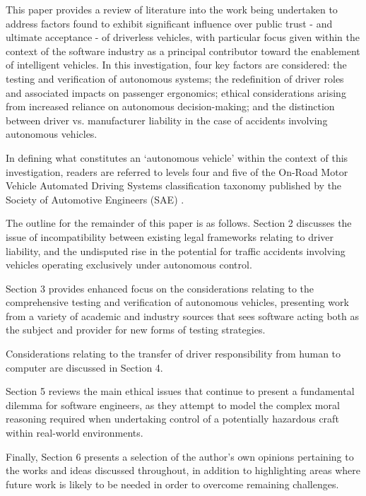 \documentclass[conference]{IEEEtran}
\begin{document}
 This paper provides a review of literature into the work being undertaken to address factors found to exhibit significant influence over public trust - and ultimate acceptance - of driverless vehicles, with particular focus given within the context of the software industry as a principal contributor toward the enablement of intelligent vehicles. In this investigation, four key factors are considered: the testing and verification of autonomous systems; the redefinition of driver roles and associated impacts on passenger ergonomics; ethical considerations arising from increased reliance on autonomous decision-making; and the distinction between driver vs. manufacturer liability in the case of accidents involving autonomous vehicles. 
 
 In defining what constitutes an `autonomous vehicle' within the context of this investigation, readers are referred to levels four and five of the On-Road Motor Vehicle Automated Driving Systems classification taxonomy published by the Society of Automotive Engineers (SAE) \cite{sae-automated-list}.
 
 The outline for the remainder of this paper is as follows. Section 2 discusses the issue of  incompatibility between existing legal frameworks relating to driver liability, and the undisputed rise in the potential for traffic accidents involving vehicles operating exclusively under autonomous control. 
 
Section 3 provides enhanced focus on the considerations relating to the comprehensive testing and verification of autonomous vehicles, presenting work from a variety of academic and industry sources that sees software acting both as the subject and provider for new forms of testing strategies.

Considerations relating to the transfer of driver responsibility from human to computer are discussed in Section 4. 

Section 5 reviews the main ethical issues that continue to present a fundamental dilemma for software engineers, as they attempt to model the complex moral reasoning required when undertaking control of a potentially hazardous craft within real-world environments.

Finally, Section 6 presents a selection of the author's own opinions pertaining to the works and ideas discussed throughout, in addition to highlighting areas where future work is likely to be needed in order to overcome remaining challenges.

\end{document}
